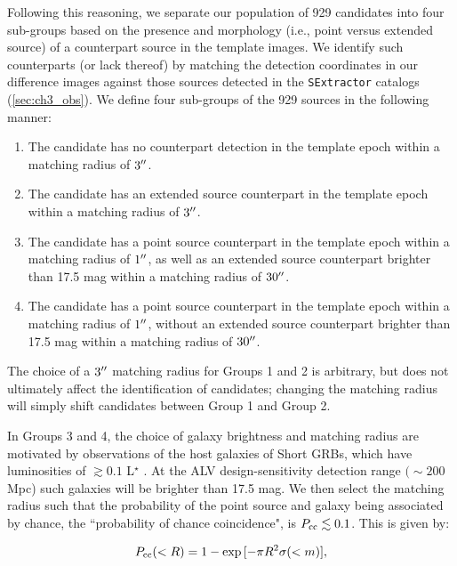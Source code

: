 Following this reasoning, we separate our population of 929 candidates into four sub-groups based on the presence and morphology (i.e., point versus extended source) of a counterpart source in the template images. We identify such counterparts (or lack thereof) by matching the detection coordinates in our difference images against those sources detected in the {\tt SExtractor} catalogs (\cref{sec:ch3_obs}). We define four sub-groups of the 929 sources in the following manner:

\begin{enumerate}
\item The candidate has no counterpart detection in the template epoch within a matching radius of $3\hbox{$^{\prime\prime}$}$.

\item The candidate has an extended source counterpart in the template epoch within a matching radius of $3 \hbox{$^{\prime\prime}$}$.

\item The candidate has a point source counterpart in the template epoch within a matching radius of $1\hbox{$^{\prime\prime}$}$, as well as an extended source counterpart brighter than 17.5 mag within a matching radius of $30\hbox{$^{\prime\prime}$}$.

\item The candidate has a point source counterpart in the template epoch within a matching radius of $1\hbox{$^{\prime\prime}$}$, without an extended source counterpart brighter than 17.5 mag  within a matching radius of $30\hbox{$^{\prime\prime}$}$.
\end{enumerate}

The choice of a $3\hbox{$^{\prime\prime}$}$ matching radius for Groups 1 and 2 is arbitrary, but does not ultimately affect the identification of candidates; changing the matching radius will simply shift candidates between Group 1 and Group 2.

In Groups 3 and 4, the choice of galaxy brightness and matching radius are motivated by observations of the host galaxies of Short GRBs, which have luminosities of $\gtrsim 0.1$ L$^\star$ \citep{FongBerger13,Fong+13,Berger2014}. At the ALV design-sensitivity detection range $(\sim 200$ Mpc) such galaxies will be brighter than 17.5 mag. We then select the matching radius such that the probability of the point source and galaxy being associated by chance, the ``probability of chance coincidence", is $P_{\rm cc}\lesssim 0.1$. This is given by:

\begin{equation}
P_{\rm cc}(<R) = 1 - \exp{[-\pi R^2 \sigma(<m)]},
\end{equation}

